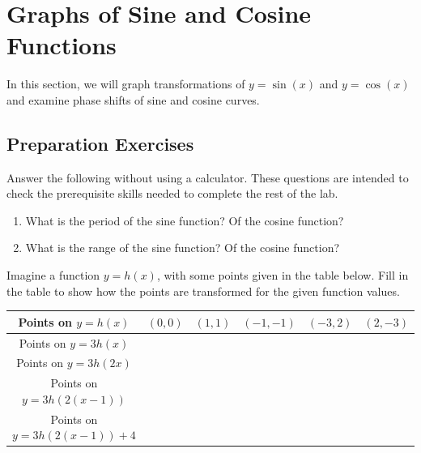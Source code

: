 
\section{Graphs of Sine and Cosine Functions} \label{section-graphs-of-sin-and-cos}
In this section, we will graph transformations of $y=\sin(x)$ and $y=\cos(x)$ and examine phase shifts of sine and cosine curves.


\subsection*{Preparation Exercises} \label{preparation-exercises-section-graphs-of-sin-and-cos}

Answer the following without using a calculator. These questions are intended to check the prerequisite skills needed to complete the rest of the lab.

\begin{myPrep}
	\begin{enumerate}
		\item What is the period of the sine function? Of the cosine function?
		\vspace{1cm}
		\item What is the range of the sine function? Of the cosine function?
		\vspace{1cm}
	\end{enumerate}
\end{myPrep}


\begin{myPrep}
	Imagine a function $y=h(x)$, with some points given in the table below. Fill in the table to show how the points are transformed for the given function values.
		\begin{center}
			\renewcommand{\arraystretch}{1.5} 
			\begin{tabular}{|| c | P{1.5cm} | P{1.5cm} | P{1.5cm} | P{1.5cm} | P{1.5cm} ||}
				\hline
				Points on $y=h(x)$ & $(0,0)$ & $(1,1)$ & $(-1,-1)$ & $(-3,2)$ & $(2,-3)$\\
				\hline\hline
				Points on $y=3h(x)$ & & & & &\\ 
				\hline
				Points on $y=3h(2x)$ & & & & &\\ 
				\hline
				Points on $y=3h(2(x-1))$ & & & & &\\ 
				\hline
				Points on $y=3h(2(x-1))+4$ & & & & &\\ 
				\hline
			\end{tabular}
		\end{center}
\end{myPrep}
\vfill


